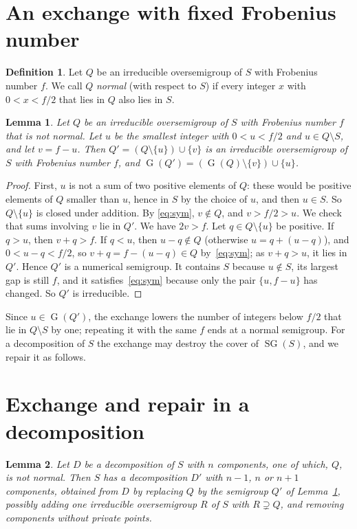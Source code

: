 \documentclass[11pt]{article}
\newtheorem{lemma}{Lemma}
\theoremstyle{definition}
\newtheorem{definition}{Definition}
\theoremstyle{remark}
\DeclareMathOperator{\SG}{SG}
\DeclareMathOperator{\G}{G}
\begin{document}
\section{An exchange with fixed Frobenius number}\label{sec:swap}

\begin{definition}
Let $Q$ be an irreducible oversemigroup of $S$ with Frobenius number $f$. We
call $Q$ \emph{normal} (with respect to $S$) if every integer $x$ with
$0<x<f/2$ that lies in $Q$ also lies in $S$.
\end{definition}

\begin{lemma}\label{lem:swap}
Let $Q$ be an irreducible oversemigroup of $S$ with Frobenius number $f$ that
is not normal. Let $u$ be the smallest integer with $0<u<f/2$ and $u\in
Q\setminus S$, and let $v=f-u$. Then
$Q'=(Q\setminus\{u\})\cup\{v\}$ is an irreducible oversemigroup of $S$ with
Frobenius number $f$, and $\G(Q')=(\G(Q)\setminus\{v\})\cup\{u\}$.
\end{lemma}

\begin{proof}
First, $u$ is not a sum of two positive elements of $Q$: these would be
positive elements of $Q$ smaller than $u$, hence in $S$ by the choice of $u$,
and then $u\in S$. So $Q\setminus\{u\}$ is closed under addition. By
\eqref{eq:sym}, $v\notin Q$, and $v>f/2>u$. We check that sums involving $v$
lie in $Q'$. We have $2v>f$. Let $q\in Q\setminus\{u\}$ be positive. If
$q>u$, then $v+q>f$. If $q<u$, then $u-q\notin Q$ (otherwise
$u=q+(u-q)$), and $0<u-q<f/2$, so $v+q=f-(u-q)\in Q$ by~\eqref{eq:sym}; as
$v+q>u$, it lies in $Q'$. Hence $Q'$ is a numerical semigroup. It contains
$S$ because $u\notin S$, its largest gap is still $f$, and it
satisfies~\eqref{eq:sym} because only the pair $\{u,f-u\}$ has changed. So
$Q'$ is irreducible.
\end{proof}

Since $u\in\G(Q')$, the exchange lowers the number of integers below $f/2$
that lie in $Q\setminus S$ by one; repeating it with the same $f$ ends at a
normal semigroup. For a decomposition of $S$ the exchange may destroy the
cover of $\SG(S)$, and we repair it as follows.

\section{Exchange and repair in a decomposition}\label{sec:step}

\begin{lemma}\label{lem:step}
Let $D$ be a decomposition of $S$ with $n$ components, one of which, $Q$, is
not normal. Then $S$ has a decomposition $D'$ with $n-1$, $n$ or $n+1$
components, obtained from $D$ by replacing $Q$ by the semigroup $Q'$ of
Lemma~\ref{lem:swap}, possibly adding one irreducible oversemigroup $R$ of $S$
with $R\supsetneq Q$, and removing components without private points.
\end{lemma}
\end{document}
